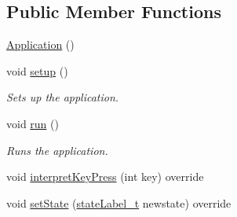 \subsection*{Public Member Functions}
\begin{DoxyCompactItemize}
\item 
\hyperlink{classdrumpi_1_1Application_afa8cc05ce6b6092be5ecdfdae44e05f8}{Application} ()
\item 
void \hyperlink{classdrumpi_1_1Application_a31dd3f7f8fba9fc2fd32ceaff6ce36e7}{setup} ()
\begin{DoxyCompactList}\small\item\em Sets up the application. \end{DoxyCompactList}\item 
void \hyperlink{classdrumpi_1_1Application_a68965449404743bf1add056784d6cf81}{run} ()
\begin{DoxyCompactList}\small\item\em Runs the application. \end{DoxyCompactList}\item 
void \hyperlink{classdrumpi_1_1Application_af9f0221f37ccb5e324599554ac5ceadf}{interpret\+Key\+Press} (int key) override
\item 
void \hyperlink{classdrumpi_1_1Application_a39fcfaf7262d03c0c6824edcd552de4f}{set\+State} (\hyperlink{namespacedrumpi_af70ab0854d65f24f7fa353fdc1c46bc9}{state\+Label\+\_\+t} newstate) override
\end{DoxyCompactItemize}
